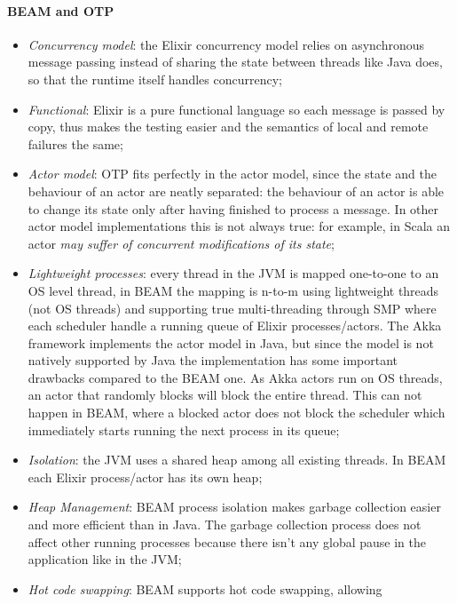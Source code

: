 \paragraph{BEAM and OTP}
\begin{itemize}
  \item \textit{Concurrency model}: the Elixir concurrency model relies on
        asynchronous message passing instead of sharing the state between
        threads like Java does, so that the runtime itself handles concurrency;
  \item \textit{Functional}: Elixir is a pure functional language so each
        message is passed by copy, thus makes the testing easier and the
        semantics of local and remote failures the same;
  \item \textit{Actor model}: OTP fits perfectly in the actor model, since the
        state and the behaviour of an actor are neatly separated: the behaviour
        of an actor is able to change its state only after having finished to
        process a message.
        In other actor model implementations this is not always true: for
        example, in Scala an actor \textit{may suffer of concurrent
        modifications of its state};
  \item \textit{Lightweight processes}: every thread in the JVM is mapped
        one-to-one to an OS level thread, in BEAM the mapping is n-to-m using
        lightweight threads (not OS threads) and supporting true multi-threading
        through SMP where each scheduler handle a running queue of Elixir
        processes/actors. The Akka framework implements the actor model in
        Java, but since the model is not natively supported by Java the
        implementation has some important drawbacks compared to the BEAM one.
        As Akka actors run on OS threads, an actor that randomly blocks will
        block the entire thread. This can not happen in BEAM, where a blocked
        actor does not block the scheduler which immediately starts running the
        next process in its queue;
  \item \textit{Isolation}: the JVM uses a shared heap among all existing
        threads. In BEAM each Elixir process/actor has its own heap;
  \item \textit{Heap Management}: BEAM process isolation makes garbage
        collection easier and more efficient than in Java. The garbage
        collection process does not affect other running processes because
        there isn't any global pause in the application like in the JVM;
    \item \textit{Hot code swapping}: BEAM supports hot code swapping, allowing

\end{itemize}
